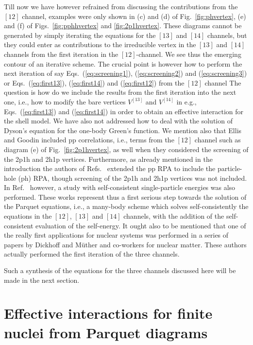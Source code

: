 Till now we have however refrained from discussing the contributions
from the $[12]$ channel, examples were only shown in (c) and (d) of
Fig.\ \ref{fig:phvertex}, (e) and (f) of Figs.\ \ref{fig:pphhvertex}
and \ref{fig:2p1hvertex}. 
These diagrams cannot be generated by simply iterating
the equations for the $[13]$ and $[14]$ channels, but they could enter
as contributions to the irreducible vertex 
in the $[13]$ and $[14]$ channels from the first iteration
in the $[12]$-channel. 
We see thus the emerging contour of an iterative scheme.
The crucial point is however how to perform the next iteration of say
Eqs.\ (\ref{eq:screening1}),
(\ref{eq:screening2}) and (\ref{eq:screening3}) or
Eqs.\ (\ref{eq:first13}),
(\ref{eq:first14})  and (\ref{eq:first12}) from the 
$[12]$ channel
The question is how do we include the results
from the first iteration into the next one, i.e.,
how to modify the bare vertices $V^{[13]}$ and $V^{[14]}$
in e.g., Eqs.\ (\ref{eq:first13}) and
(\ref{eq:first14}) in order to obtain
an effective interaction for the shell model.
We have also not addressed how to deal
with the solution of Dyson's equation for the one-body
Green's function. 
We mention also that Ellis and Goodin \cite{eg80} 
included pp correlations, i.e., terms from the $[12]$ channel
such as diagram (e) of Fig.\ \ref{fig:2p1hvertex},
as well when they considered the screening of the 2p1h and 2h1p vertices.
Furthermore, as already mentioned in the introduction 
the authors of Refs.\ \cite{emm91,hmm95}
extended the pp RPA to include the particle-hole (ph) RPA, though
screening of the 2p1h and 2h1p vertices was not included. In Ref.\ 
\cite{hmm95} however, a study with 
self-consistent  single-particle energies was also performed.
These works represent thus a first serious step towards the solution
of the Parquet equations, i.e., a many-body scheme which solves
self-consistently the equations in the $[12]$, $[13]$ and $[14]$
channels, with the addition of the self-consistent evaluation
of the self-energy. It ought also to be mentioned 
that one of the really
first applications for nuclear systems was performed 
in a series of papers by Dickhoff and M\"uther and co-workers
\cite{nuclearmatter}  for nuclear matter. These authors
actually performed the first iteration of the three
channels.

Such a  synthesis of the equations for the 
three channels discussed here
will be made in the next section.
 
\section{Effective interactions for finite nuclei 
         from Parquet diagrams}
\label{sec:sec5} 


